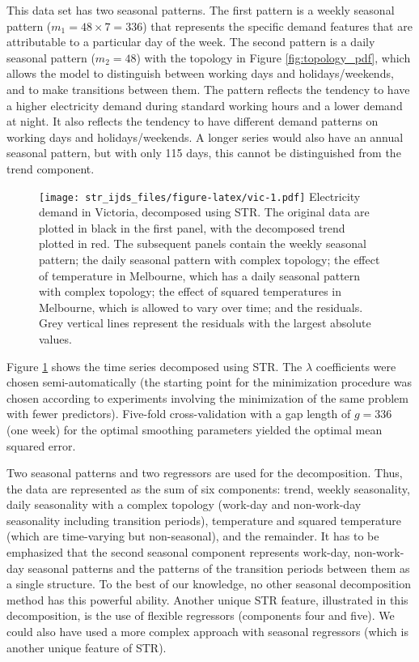 \documentclass[ijds,nonblindrev]{informs-ijds}
\begin{document}
This data set has two seasonal patterns. The first pattern is a weekly seasonal pattern (\(m_1=48\times7=336\)) that represents the specific demand features that are attributable to a particular day of the week. The second pattern is a daily seasonal pattern (\(m_2=48\)) with the topology in Figure \ref{fig:topology_pdf}, which allows the model to distinguish between working days and holidays/weekends, and to make transitions between them. The pattern reflects the tendency to have a higher electricity demand during standard working hours and a lower demand at night. It also reflects the tendency to have different demand patterns on working days and holidays/weekends. A longer series would also have an annual seasonal pattern, but with only 115 days, this cannot be distinguished from the trend component.

\begin{figure}\FIGURE
{\texttt{[image: str\_ijds\_files/figure-latex/vic-1.pdf]}}
{\label{fig:vic}Electricity demand in Victoria, decomposed using STR. The original data are plotted in black in the first panel, with the decomposed trend plotted in red. The subsequent panels contain the weekly seasonal pattern; the daily seasonal pattern with complex topology; the effect of temperature in Melbourne, which has a daily seasonal pattern with complex topology; the effect of squared temperatures in Melbourne, which is allowed to vary over time; and the residuals. Grey vertical lines represent the residuals with the largest absolute values.}
{}
\end{figure}

Figure \ref{fig:vic} shows the time series decomposed using STR.
The \(\lambda\) coefficients were chosen semi-automatically (the starting point for the minimization procedure was chosen according to experiments involving the minimization of the same problem with fewer predictors). Five-fold cross-validation with a gap length of \(g=336\) (one week) for the optimal smoothing parameters yielded the optimal mean squared error.

Two seasonal patterns and two regressors are used for the decomposition.
Thus, the data are represented as the sum of six components: trend, weekly seasonality, daily seasonality with a complex topology (work-day and non-work-day seasonality including transition periods), temperature and squared temperature (which are time-varying but non-seasonal), and the remainder. It has to be emphasized that the second seasonal component represents work-day, non-work-day seasonal patterns and the patterns of the transition periods between them as a single structure. To the best of our knowledge, no other seasonal decomposition method has this powerful ability. Another unique STR feature, illustrated in this decomposition, is the use of flexible regressors (components four and five). We could also have used a more complex approach with seasonal regressors (which is another unique feature of STR).
\end{document}
